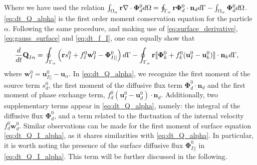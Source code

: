 Where we have used the relation $\int_{\Omega_\alpha} \textbf{r}  \mathbf{\nabla}\cdot \bm\Phi_d^0  d\Omega
= \oint_{\Gamma_\alpha}  \textbf{r} \bm\Phi_d^0 \cdot \textbf{n}_d  d\Gamma
- \int_{\Omega_\alpha}  \bm\Phi_d^0  d\Omega$. 
\ref{eq:dt_Q_alpha} is the first order moment conservation equation for the particle $\alpha$. 
Following the same procedure, and making use of \ref{eq:surface_derivative}, \ref{eq:gauss_surface} and \ref{eq:dt_f_I}, one can equally show that 
\begin{align}
    \frac{d}{dt} {\textbf{Q}_{I\alpha}}
    &= \oint_{\Gamma_\alpha}  \left(
        \textbf{r}s_I^0
        + f_I^0 \textbf{w}_I^0
        - \mathbf{\Phi}_{I||}^0
    \right)  d\Gamma
    - \oint_{\Gamma_\alpha} \textbf{r} 
    \llbracket \mathbf{\Phi}_k^0
        + f_k^0 (\textbf{u}_I^0 - \textbf{u}_k^0)
     \rrbracket \cdot \textbf{n}_k
     d\Gamma,
    \label{eq:dt_Q_I_alpha}
\end{align}
where $\textbf{w}_I^0 = \textbf{u}_{I||}^0 - \textbf{u}_\alpha$.
In \ref{eq:dt_Q_alpha}, we recognize the first moment of the source term $s_d^0$, the first moment of the diffusive flux term $\bm\Phi_d^0\cdot\textbf{n}_d$ and the first moment of phase exchange term, $f_d^0 (\textbf{u}_I^0-\textbf{u}_d^0)\cdot\textbf{n}_d$. 
Additionally, two supplementary terms appear in \ref{eq:dt_Q_alpha}, namely: the integral of the diffusive flux $\bm\Phi_d^0$, and a term related to the fluctuation of the internal velocity $f_d^0 \textbf{w}_d^0$.
Similar observations can be made for the first moment of surface equation \ref{eq:dt_Q_I_alpha}, as it shares similarities with \ref{eq:dt_Q_alpha}. 
In particular, it is worth noting the presence of the surface diffusive flux $\mathbf{\Phi}_{I||}^0$ in \ref{eq:dt_Q_I_alpha}.
This term will be further discussed in the following. 

